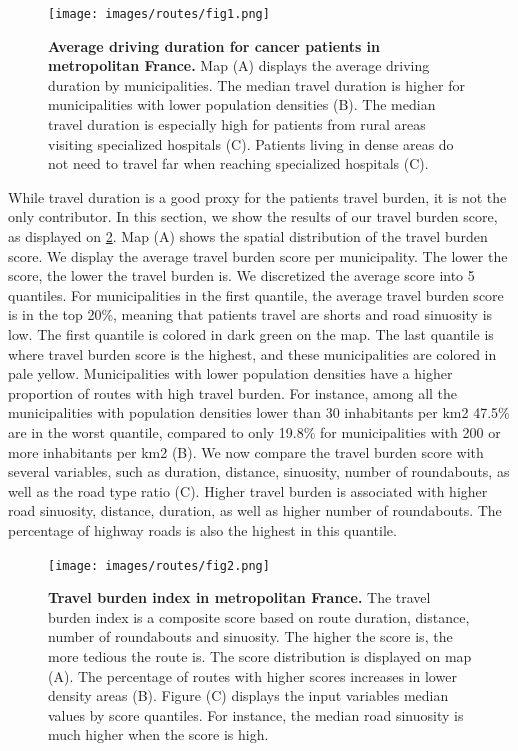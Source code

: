 \begin{figure}[H]
    \texttt{[image: images/routes/fig1.png]}
    \centering
    \caption{
        \textbf{Average driving duration for cancer patients in metropolitan France.} Map (A) displays the average driving duration by municipalities. The median travel duration is higher for municipalities with lower population densities (B). The median travel duration is especially high for patients from rural areas visiting specialized hospitals (C). Patients living in dense areas do not need to travel far when reaching specialized hospitals (C).
    }
    \label{fig:routes-duration-france}
\end{figure}

While travel duration is a good proxy for the patients travel burden, it is not the only contributor. In this section, we show the results of our travel burden score, as displayed on \cref{fig:routes-burden-index}. Map (A) shows the spatial distribution of the travel burden score. We display the average travel burden score per municipality. The lower the score, the lower the travel burden is. We discretized the average score into 5 quantiles. For municipalities in the first quantile, the average travel burden score is in the top 20\%, meaning that patients travel are shorts and road sinuosity is low. The first quantile is colored in dark green on the map. The last quantile is where travel burden score is the highest, and these municipalities are colored in pale yellow. Municipalities with lower population densities have a higher proportion of routes with high travel burden. For instance, among all the municipalities with population densities lower than 30 inhabitants per km2 47.5\% are in the worst quantile, compared to only 19.8\% for municipalities with 200 or more inhabitants per km2 (B). We now compare the travel burden score with several variables, such as duration, distance, sinuosity, number of roundabouts, as well as the road type ratio (C). Higher travel burden is associated with higher road sinuosity, distance, duration, as well as higher number of roundabouts. The percentage of highway roads is also the highest in this quantile.

\begin{figure}[H]
    \texttt{[image: images/routes/fig2.png]}
    \centering
    \caption{
        \textbf{Travel burden index in metropolitan France.} The travel burden index is a composite score based on route duration, distance, number of roundabouts and sinuosity. The higher the score is, the more tedious the route is. The score distribution is displayed on map (A). The percentage of routes with higher scores increases in lower density areas (B). Figure (C) displays the input variables median values by score quantiles. For instance, the median road sinuosity is much higher when the score is high.
    }
    \label{fig:routes-burden-index}
\end{figure}

